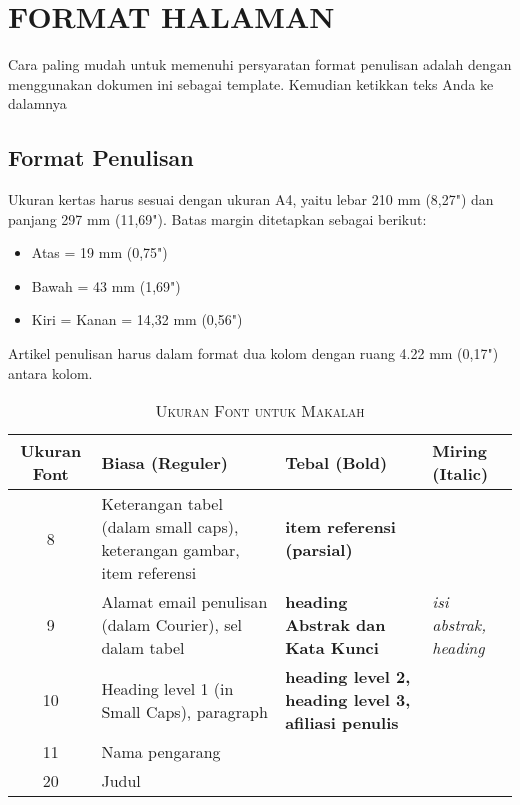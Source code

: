 \documentclass[10pt,twocolumn]{article}
\begin{document}
\twocolumn[
\begin{@twocolumnfalse}

\vspace{1em}
\end{@twocolumnfalse}
]





\section{\MakeUppercase{Format Halaman}}
Cara paling mudah untuk memenuhi persyaratan format penulisan adalah dengan menggunakan dokumen ini sebagai template. Kemudian ketikkan teks Anda ke dalamnya

\subsection{Format Penulisan}
Ukuran kertas harus sesuai dengan ukuran A4, yaitu lebar 210 mm (8,27") dan panjang 297 mm (11,69"). Batas margin ditetapkan sebagai berikut:
\begin{itemize}
\item Atas = 19 mm (0,75")
\item Bawah = 43 mm (1,69")
\item Kiri = Kanan = 14,32 mm (0,56")
\end{itemize}

Artikel penulisan harus dalam format dua kolom dengan ruang 4.22 mm (0,17") antara kolom.

\begin{table}[h]
\centering
\caption{{\eightp\textsc{Ukuran Font untuk Makalah}}}
\label{tab:font_sizes}
{\eightp
\begin{tabular}{|c|p{2.5cm}|p{1.8cm}|p{1.8cm}|}
\hline
\textbf{Ukuran Font} & \textbf{Biasa (Reguler)} & \textbf{Tebal (Bold)} & \textbf{Miring (Italic)} \\
\hline
8 & Keterangan tabel (dalam small caps), keterangan gambar, item referensi & \textbf{item referensi (parsial)} & \\
\hline
9 & Alamat email penulisan (dalam Courier), sel dalam tabel & \textbf{heading Abstrak dan Kata Kunci} & \textit{isi abstrak, heading} \\
\hline
10 & Heading level 1 (in Small Caps), paragraph & \textbf{heading level 2, heading level 3, afiliasi penulis} & \\
\hline
11 & Nama pengarang & & \\
\hline
20 & Judul & & \\
\hline
\end{tabular}
}
\end{table}
\end{document}
